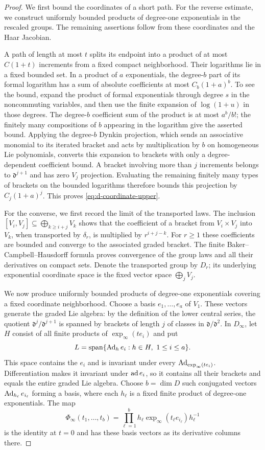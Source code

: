 \begin{proof}
We first bound the coordinates of a short path. For the reverse estimate,
we construct uniformly bounded products of degree-one exponentials in
the rescaled groups. The remaining assertions follow from these
coordinates and the Haar Jacobian.

A path of length at most $t$ splits its endpoint into a product of
at most $C(1+t)$ increments from a fixed compact neighborhood.  Their
logarithms lie in a fixed bounded set.  In a product of $a$ exponentials,
the degree-$b$ part of its formal logarithm has a sum of absolute
coefficients at most $C_b(1+a)^b$.  To see the bound, expand the product
of formal exponentials through degree $s$ in the noncommuting variables,
and then use the finite expansion of $\log(1+u)$ in those degrees.
The degree-$b$ coefficient sum of the product is at most $a^b/b!$;
the finitely many compositions of $b$ appearing in the logarithm give
the asserted bound.  Applying the degree-$b$ Dynkin projection, which
sends an associative monomial to its iterated bracket and acts by
multiplication by $b$ on homogeneous Lie polynomials, converts this
expansion to brackets with only a degree-dependent coefficient bound.
A bracket involving more than $j$ increments belongs to
$\mathfrak d^{j+1}$ and has zero $V_j$ projection.  Evaluating the
remaining finitely many types of brackets on the bounded logarithms
therefore bounds this projection by $C_j(1+a)^j$.  This proves
\eqref{eq:d-coordinate-upper}.

For the converse, we first record the limit of the transported laws.
The inclusion
$[V_i,V_j]\subseteq\bigoplus_{k\ge i+j}V_k$ shows that the coefficient
of a bracket from $V_i\times V_j$ into $V_k$, when transported by
$\delta_r$, is multiplied by $r^{i+j-k}$.  For $r\ge1$ these
coefficients are bounded and converge to the associated graded bracket.
The finite Baker--Campbell--Hausdorff formula proves convergence of the
group laws and all their derivatives on compact sets.  Denote the
transported group by $D_r$; its underlying exponential coordinate space
is the fixed vector space $\bigoplus_jV_j$.

We now produce uniformly bounded products of degree-one exponentials
covering a fixed coordinate neighborhood.  Choose a basis
$e_1,\ldots,e_a$ of $V_1$.  These vectors generate the graded Lie algebra:
by the definition of the lower central series, the quotient
$\mathfrak d^j/\mathfrak d^{j+1}$ is spanned by brackets of length $j$
of classes in $\mathfrak d/\mathfrak d^2$.
In $D_\infty$, let $H$ consist of all finite products of
$\exp_\infty(t e_i)$ and put
\[
 L=\operatorname{span}\{\operatorname{Ad}_h e_i:h\in H,\ 1\le i\le a\}.
\]
This space contains the $e_i$ and is invariant under every
$\operatorname{Ad}_{\exp_\infty(t e_i)}$.  Differentiation makes it invariant under
$\operatorname{ad} e_i$, so it contains all their brackets and equals the entire
graded Lie algebra.  Choose $b=\dim D$ such conjugated vectors
$\operatorname{Ad}_{h_\ell}e_{i_\ell}$ forming a basis, where each $h_\ell$ is a
fixed finite product of degree-one exponentials.  The map
\[
 \Phi_\infty(t_1,\ldots,t_b)
   =\prod_{\ell=1}^b
      h_\ell\exp_\infty(t_\ell e_{i_\ell})h_\ell^{-1}
\]
is the identity at $t=0$ and has these basis vectors as its derivative
columns there.


\end{proof}
